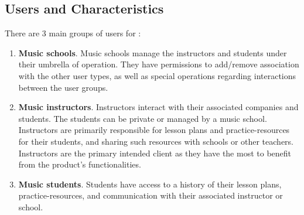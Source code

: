     \subsection{Users and Characteristics}\label{sec:users-characteristics}
        There are 3 main groups of users for \projectName:
        \begin{enumerate}
            \item \textbf{Music schools}. Music schools manage the instructors and students under their umbrella of operation. They have permissions to add/remove association with the other user types, as well as special operations regarding interactions between the user groups.
            \item \textbf{Music instructors}. Instructors interact with their associated companies and students. The students can be private or managed by a music school. Instructors are primarily responsible for \glspl{lesson plan} and \glspl{practice-resource} for their students, and sharing such resources with schools or other teachers. Instructors are the primary intended client as they have the most to benefit from the product's functionalities.
            \item \textbf{Music students}. Students have access to a history of their \glspl{lesson plan}, \glspl{practice-resource}, and communication with their associated instructor or school. 
        \end{enumerate}
